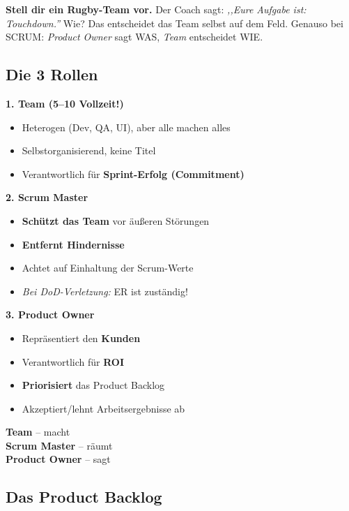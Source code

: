 \documentclass[11pt,a4paper]{article}
\begin{document}
\begin{story}
\textbf{Stell dir ein Rugby-Team vor.} Der Coach sagt: \emph{,,Eure Aufgabe ist: Touchdown.''} Wie? Das entscheidet das Team selbst auf dem Feld. Genauso bei SCRUM: \emph{Product Owner} sagt WAS, \emph{Team} entscheidet WIE.
\end{story}

\subsection{Die 3 Rollen}

\begin{keyfacts}
\textbf{1. Team (5--10 Vollzeit!)}
\begin{itemize}
  \item Heterogen (Dev, QA, UI), aber alle machen alles
  \item Selbstorganisierend, keine Titel
  \item Verantwortlich für \textbf{Sprint-Erfolg (Commitment)}
\end{itemize}

\textbf{2. Scrum Master}
\begin{itemize}
  \item \textbf{Schützt das Team} vor äußeren Störungen
  \item \textbf{Entfernt Hindernisse}
  \item Achtet auf Einhaltung der Scrum-Werte
  \item \emph{Bei DoD-Verletzung:} ER ist zuständig!
\end{itemize}

\textbf{3. Product Owner}
\begin{itemize}
  \item Repräsentiert den \textbf{Kunden}
  \item Verantwortlich für \textbf{ROI}
  \item \textbf{Priorisiert} das Product Backlog
  \item Akzeptiert/lehnt Arbeitsergebnisse ab
\end{itemize}
\end{keyfacts}

\begin{merkhilfe}
\textbf{Team} -- macht\\
\textbf{Scrum Master} -- räumt\\
\textbf{Product Owner} -- sagt
\end{merkhilfe}

\subsection{Das Product Backlog}
\end{document}
